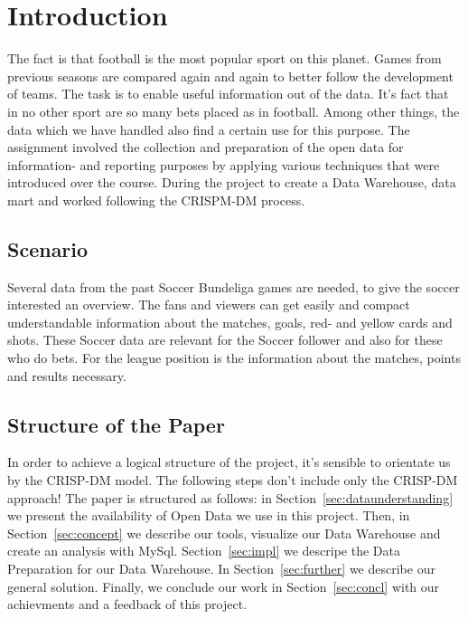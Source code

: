 \documentclass[11pt, journal]{IEEEtran}
\begin{document}


\section{Introduction}
\label{sec:intro}
The fact is that football is the most popular sport on this planet. Games from previous seasons are compared again and again to better follow the development of teams. 
The task is to enable useful information out of the data. It’s fact that in no other sport are so many bets placed as in football. Among other things, the data which we have handled also find a certain use for this purpose. The assignment involved the collection and preparation of the open data for information- and reporting purposes by applying various techniques that were introduced over the course. During the project to create a Data Warehouse, data mart and worked following the CRISPM-DM process.

\subsection{Scenario} \label{subsec:scenario}
Several data from the past Soccer Bundeliga games are needed, to give the soccer interested an overview. The fans and viewers can get easily and compact understandable information about the matches, goals, red- and yellow cards and shots. These Soccer data are relevant for the Soccer follower and also for these who do bets. For the league position is the information about the matches, points and results necessary. 

\subsection{Structure of the Paper} \label{subsec:struct}
In order to achieve a logical structure of the project, it’s sensible to orientate us by  the CRISP-DM model. The following steps don’t include only the CRISP-DM approach!
The paper is structured as follows: in Section~\ref{sec:dataunderstanding} we present the availability of Open Data we use in this project.
Then, in Section~\ref{sec:concept} we describe our tools, visualize our Data Warehouse and create an analysis with MySql. Section~\ref{sec:impl} we descripe the Data Preparation for our Data Warehouse. In Section~\ref{sec:further} we describe our general solution. Finally, we conclude our work in Section~\ref{sec:concl} with our achievments and a feedback of this project.
\end{document}
